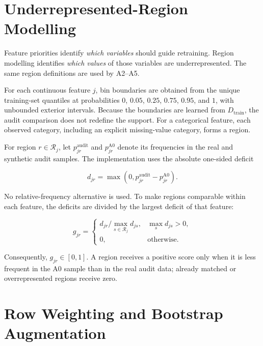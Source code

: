 \section{Underrepresented-Region Modelling}
\label{sec:region_modelling}

Feature priorities identify \emph{which variables} should guide retraining.
Region modelling identifies \emph{which values} of those variables are
underrepresented. The same region definitions are used by A2--A5.

For each continuous feature $j$, bin boundaries are obtained from the unique
training-set quantiles at probabilities $0$, $0.05$, $0.25$, $0.75$, $0.95$,
and $1$, with unbounded exterior intervals. Because the boundaries are learned
from $D_{\mathrm{train}}$, the audit comparison does not redefine the support.
For a categorical feature, each observed category, including an explicit
missing-value category, forms a region.

For region $r\in\mathcal{R}_j$, let $p^{\mathrm{audit}}_{jr}$ and
$p^{\mathrm{A0}}_{jr}$ denote its frequencies in the real and synthetic audit
samples. The implementation uses the absolute one-sided deficit

\begin{equation}
    d_{jr} = \max\left(0,
        p^{\mathrm{audit}}_{jr}-p^{\mathrm{A0}}_{jr}\right).
    \label{eq:region_deficit}
\end{equation}

No relative-frequency alternative is used. To make regions comparable within
each feature, the deficits are divided by the largest deficit of that feature:

\begin{equation}
    g_{jr} =
    \begin{cases}
        d_{jr}/\max_{s\in\mathcal{R}_j}d_{js},
            & \max_s d_{js}>0,\\
        0, & \text{otherwise}.
    \end{cases}
    \label{eq:normalized_region_deficit}
\end{equation}

Consequently, $g_{jr}\in[0,1]$. A region receives a positive score only when
it is less frequent in the A0 sample than in the real audit data; already
matched or overrepresented regions receive zero.

\section{Row Weighting and Bootstrap Augmentation}
\label{sec:row_weighting}

